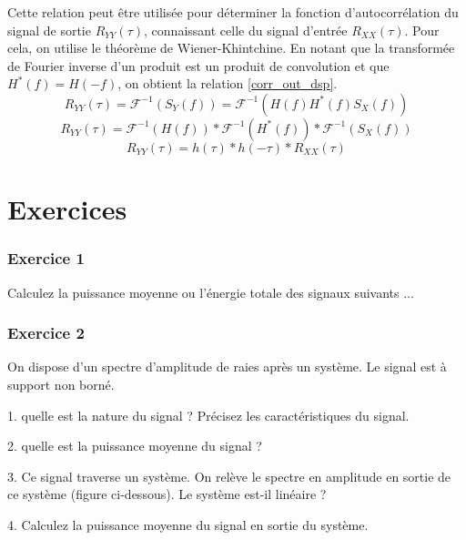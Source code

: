 	Cette relation peut être utilisée pour déterminer la fonction d'autocorrélation du signal de sortie $R_{YY}(\tau)$, connaissant celle du signal d'entrée $R_{XX}(\tau)$. Pour cela, on utilise le théorème de Wiener-Khintchine. En notant que la transformée de Fourier inverse d'un produit est un produit de convolution et que $H^{*}(f)=H(-f)$, on obtient la relation \ref{corr_out_dsp}.  
	\begin{equation*}
	R_{YY}(\tau)=\mathcal{F}^{-1}(S_{Y}(f))=\mathcal{F}^{-1}(H(f)H^{*}(f)S_{X}(f))
	\end{equation*}
	\begin{equation*}
	R_{YY}(\tau)=\mathcal{F}^{-1}(H(f))*\mathcal{F}^{-1}(H^{*}(f))*\mathcal{F}^{-1}(S_{X}(f))
	\end{equation*}
	\begin{equation}\label{corr_out_dsp}
	R_{YY}(\tau)=h(\tau)*h(-\tau)*R_{XX}(\tau)
	\end{equation}
	
	\vspace{1\baselineskip}
	
	\section{Exercices}
	
	\subsubsection{Exercice 1}
	
	Calculez la puissance moyenne ou l'énergie totale des signaux suivants ...
	
	\vspace{1\baselineskip}
	
		\subsubsection{Exercice 2}
	
	On dispose d'un spectre d'amplitude de raies après un système. Le signal est à support non borné.
	
	1. quelle est la nature du signal ? Précisez les caractéristiques du signal.
	
	2. quelle est la puissance moyenne du signal ?
	
	3. Ce signal traverse un système. On relève le spectre en amplitude en sortie de ce système (figure ci-dessous). Le système est-il linéaire ?
	
	4. Calculez la puissance moyenne du signal en sortie du système.
	
